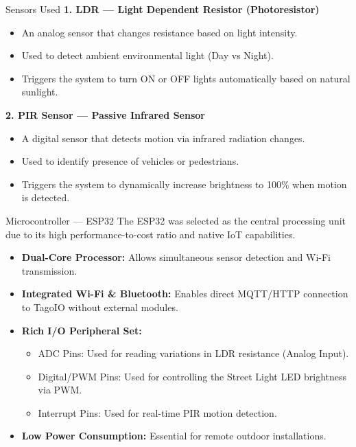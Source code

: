 \documentclass[aspectratio=169]{beamer}
\begin{document}
\begin{frame}{Sensors Used}
    \textbf{1. LDR — Light Dependent Resistor (Photoresistor)}
    \begin{itemize}
        \item An analog sensor that changes resistance based on light intensity.
        \item Used to detect ambient environmental light (Day vs Night).
        \item Triggers the system to turn ON or OFF lights automatically based on natural sunlight.
    \end{itemize}
    \vspace{0.5cm}
    \textbf{2. PIR Sensor — Passive Infrared Sensor}
    \begin{itemize}
        \item A digital sensor that detects motion via infrared radiation changes.
        \item Used to identify presence of vehicles or pedestrians.
        \item Triggers the system to dynamically increase brightness to 100\% when motion is detected.
    \end{itemize}
\end{frame}

\begin{frame}{Microcontroller — ESP32}
    The ESP32 was selected as the central processing unit due to its high performance-to-cost ratio and native IoT capabilities.
    \vspace{0.3cm}
    \begin{itemize}
        \item \textbf{Dual-Core Processor:} Allows simultaneous sensor detection and Wi-Fi transmission.
        \item \textbf{Integrated Wi-Fi \& Bluetooth:} Enables direct MQTT/HTTP connection to TagoIO without external modules.
        \item \textbf{Rich I/O Peripheral Set:}
        \begin{itemize}
            \item ADC Pins: Used for reading variations in LDR resistance (Analog Input).
            \item Digital/PWM Pins: Used for controlling the Street Light LED brightness via PWM.
            \item Interrupt Pins: Used for real-time PIR motion detection.
        \end{itemize}
        \item \textbf{Low Power Consumption:} Essential for remote outdoor installations.
    \end{itemize}
\end{frame}
\end{document}

